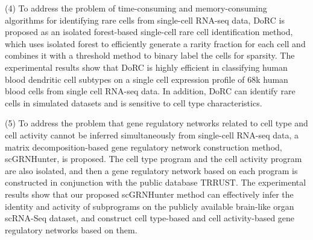 \begin{abstracten}
(4) To address the problem of time-consuming and memory-consuming algorithms for identifying rare cells from single-cell RNA-seq data, 
DoRC is proposed as an isolated forest-based single-cell rare cell identification method, 
which uses isolated forest to efficiently generate a rarity fraction for each cell and combines it with a threshold method to binary label the cells for sparsity. 
The experimental results show that DoRC is highly efficient in classifying human blood dendritic cell subtypes on a single cell expression profile of 68k human blood cells from single cell RNA-seq data. 
In addition, DoRC can identify rare cells in simulated datasets and is sensitive to cell type characteristics.

(5) To address the problem that gene regulatory networks related to cell type and cell activity cannot be inferred simultaneously from single-cell RNA-seq data, 
a matrix decomposition-based gene regulatory network construction method, scGRNHunter, is proposed. 
The cell type program and the cell activity program are also isolated, and then a gene regulatory network based on each program is constructed in conjunction with the public database TRRUST. 
The experimental results show that our proposed scGRNHunter method can effectively infer the identity and activity of subprograms on the publicly available brain-like organ scRNA-Seq dataset, 
and construct cell type-based and cell activity-based gene regulatory networks based on them.


\end{abstracten}